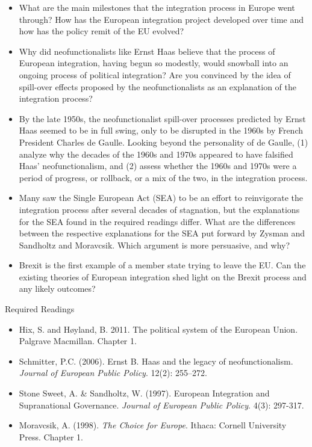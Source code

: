 \begin{itemize}
	\item What are the main milestones that the integration process in Europe went through? How has the European integration project developed over time and how has the policy remit of the EU evolved?
	\item Why did neofunctionalists like Ernst Haas believe that the process of European integration, having begun so modestly, would snowball into an ongoing process of political integration? Are you convinced by the idea of spill-over effects proposed by the neofunctionalists as an explanation of the integration process?
	\item  By the late 1950s, the neofunctionalist spill-over processes predicted by Ernst Haas seemed to be in full swing, only to be disrupted in the 1960s by French President Charles de Gaulle. Looking beyond the personality of de Gaulle, (1) analyze why the decades of the 1960s and 1970s appeared to have falsified Haas’ neofunctionalism, and (2) assess whether the 1960s and 1970s were a period of progress, or rollback, or a mix of the two, in the integration process.
	\item Many saw the Single European Act (SEA) to be an effort to reinvigorate the integration process after several decades of stagnation, but the explanations for the SEA found in the required readings differ. What are the differences between the respective explanations for the SEA put forward by Zysman and Sandholtz and Moravcsik. Which argument is more persuasive, and why?
	\item Brexit is the first example of a member state trying to leave the EU. Can the existing theories of European integration shed light on the Brexit process and any likely outcomes?
\end{itemize}

\noindent Required Readings

\begin{itemize}
	\item Hix, S. and H\o yland, B. 2011. The political system of the European Union. Palgrave Macmillan. Chapter 1.
	\item Schmitter, P.C. (2006). Ernst B. Haas and the legacy of neofunctionalism. \textit{Journal of European Public Policy}. 12(2): 255–272.
	\item Stone Sweet, A. \& Sandholtz, W. (1997). European Integration and Supranational Governance. \textit{Journal of European Public Policy}. 4(3): 297-317.
	\item Moravcsik, A. (1998). \textit{The Choice for Europe}. Ithaca: Cornell University Press. Chapter 1.
\end{itemize}

